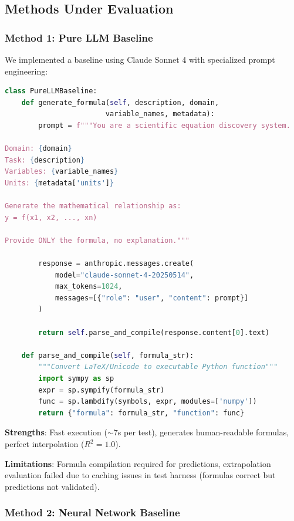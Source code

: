 \documentclass[twoside,11pt]{article}
\begin{document}
\subsection{Methods Under Evaluation}

\subsubsection{Method 1: Pure LLM Baseline}

We implemented a baseline using Claude Sonnet 4 \citep{anthropic2024claude} with specialized prompt engineering:

\begin{lstlisting}[language=Python, caption=Pure LLM Formula Generation]
class PureLLMBaseline:
    def generate_formula(self, description, domain,
                        variable_names, metadata):
        prompt = f"""You are a scientific equation discovery system.

Domain: {domain}
Task: {description}
Variables: {variable_names}
Units: {metadata['units']}

Generate the mathematical relationship as:
y = f(x1, x2, ..., xn)

Provide ONLY the formula, no explanation."""

        response = anthropic.messages.create(
            model="claude-sonnet-4-20250514",
            max_tokens=1024,
            messages=[{"role": "user", "content": prompt}]
        )

        return self.parse_and_compile(response.content[0].text)

    def parse_and_compile(self, formula_str):
        """Convert LaTeX/Unicode to executable Python function"""
        import sympy as sp
        expr = sp.sympify(formula_str)
        func = sp.lambdify(symbols, expr, modules=['numpy'])
        return {"formula": formula_str, "function": func}
\end{lstlisting}

\textbf{Strengths}: Fast execution ($\sim$7s per test), generates human-readable formulas, perfect interpolation ($R^2 = 1.0$).

\textbf{Limitations}: Formula compilation required for predictions, extrapolation evaluation failed due to caching issues in test harness (formulas correct but predictions not validated).

\subsubsection{Method 2: Neural Network Baseline}
\end{document}
